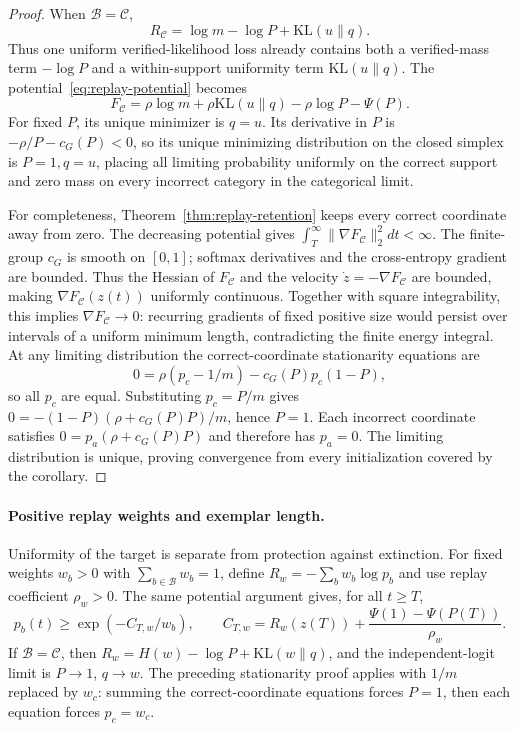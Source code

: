 \documentclass{article}
\newcommand{\1}{\mathbf 1}
\theoremstyle{remark}
\theoremstyle{definition}
\theoremstyle{plain}
\begin{document}
\begin{proof}
When $\mathcal B=\mathcal C$,
\begin{equation}
  R_{\mathcal C}
  =\log m-\log P+\mathrm{KL}(u\|q).
  \label{eq:replay-mass-uniformity-decomposition}
\end{equation}
Thus one uniform verified-likelihood loss already contains both a verified-mass
term $-\log P$ and a within-support uniformity term $\mathrm{KL}(u\|q)$. The
potential~\eqref{eq:replay-potential} becomes
\[
  F_{\mathcal C}
  =\rho\log m+\rho\mathrm{KL}(u\|q)
   -\rho\log P-\Psi(P).
\]
For fixed $P$, its unique minimizer is $q=u$. Its derivative in $P$ is
$-\rho/P-c_G(P)<0$, so its unique minimizing distribution on the closed
simplex is $P=1,q=u$,
placing all limiting probability uniformly on the correct support and zero
mass on every incorrect category in the categorical limit.

For completeness, Theorem~\ref{thm:replay-retention} keeps every correct
coordinate away from zero. The decreasing potential gives
$\int_T^\infty\lVert\nabla F_{\mathcal C}\rVert_2^2dt<\infty$.
The finite-group $c_G$ is smooth on $[0,1]$; softmax derivatives and the
cross-entropy gradient are bounded. Thus the Hessian of $F_{\mathcal C}$ and
the velocity $\dot z=-\nabla F_{\mathcal C}$ are bounded, making
$\nabla F_{\mathcal C}(z(t))$ uniformly continuous. Together with square
integrability, this implies $\nabla F_{\mathcal C}\to0$: recurring gradients
of fixed positive size would persist over intervals of a uniform minimum
length, contradicting the finite energy integral. At any limiting
distribution the correct-coordinate stationarity equations are
\[
  0=\rho(p_c-1/m)-c_G(P)p_c(1-P),
\]
so all $p_c$ are equal. Substituting $p_c=P/m$ gives
$0=-(1-P)(\rho+c_G(P)P)/m$, hence $P=1$. Each incorrect coordinate satisfies
$0=p_a(\rho+c_G(P)P)$ and therefore has $p_a=0$. The limiting distribution is
unique, proving convergence from every initialization covered by the corollary.
\end{proof}

\paragraph{Positive replay weights and exemplar length.}
Uniformity of the target is separate from protection against extinction.
For fixed weights $w_b>0$ with $\sum_{b\in\mathcal B}w_b=1$, define
$R_w=-\sum_b w_b\log p_b$ and use replay coefficient $\rho_w>0$.
The same potential argument gives, for all $t\ge T$,
\[
 p_b(t)\ge\exp(-C_{T,w}/w_b),\qquad
 C_{T,w}=R_w(z(T))+\frac{\Psi(1)-\Psi(P(T))}{\rho_w}.
\]
If $\mathcal B=\mathcal C$, then
$R_w=H(w)-\log P+\mathrm{KL}(w\|q)$, and the independent-logit limit is
$P\to1$, $q\to w$. The preceding stationarity proof applies with $1/m$
replaced by $w_c$: summing the correct-coordinate equations forces $P=1$,
then each equation forces $p_c=w_c$.
\end{document}
